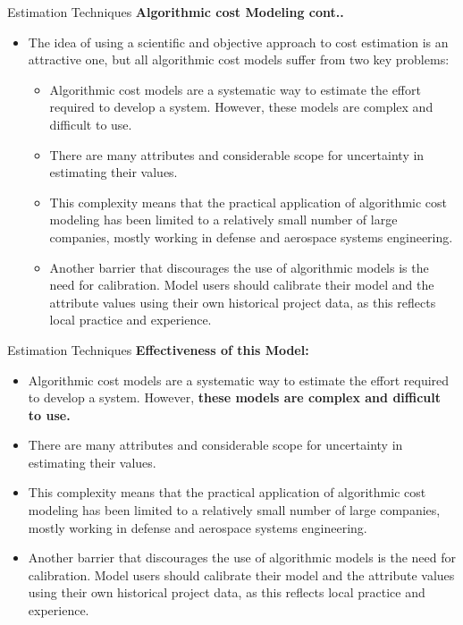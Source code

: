 \documentclass{beamer}
\begin{document}
\begin{frame}{Estimation Techniques}
	\textbf{Algorithmic cost Modeling cont..}
	\begin{itemize}
		\item The idea of using a scientific and objective approach to cost estimation is an attractive one, but all 
		algorithmic cost models suffer from two key problems:
		\begin{itemize}
			\item Algorithmic cost models are a systematic way to estimate the effort required to develop a system. 
			However, these models are complex and difficult to use. 
			\item There are many attributes and considerable scope for uncertainty in estimating their values. 
		\item This complexity means that the practical application of algorithmic cost modeling has been limited to a 
			relatively small number of large companies, mostly working in defense and aerospace systems 
			engineering.
		\item Another barrier that discourages the use of algorithmic models is the need for calibration. Model users 
			should calibrate their model and the attribute values using their own historical project data, as this 
			reflects local practice and experience.
		\end{itemize}
	\end{itemize}
\end{frame}
\begin{frame}{Estimation Techniques}
	\textbf{Effectiveness of this Model:}
	\begin{itemize}
		\item Algorithmic cost models are a systematic way to estimate the effort required to develop a system. 
		However, \textbf{these models are complex and difficult to use.} 
		\item There are many attributes and considerable scope for uncertainty in estimating their values. 
		\item This complexity means that the practical application of algorithmic cost modeling has been limited to a 
		relatively small number of large companies, mostly working in defense and aerospace systems 
		engineering.
		\item Another barrier that discourages the use of algorithmic models is the need for calibration. Model users 
		should calibrate their model and the attribute values using their own historical project data, as this 
		reflects local practice and experience.
	
	\end{itemize}
\end{frame}
\end{document}
